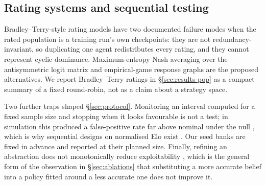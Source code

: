 \subsection{Rating systems and sequential testing}

Bradley--Terry-style rating models \cite{coulom-whr,herbrich-trueskill} have
two documented failure modes when the rated population is a training run's own
checkpoints: they are not redundancy-invariant, so duplicating one agent
redistributes every rating, and they cannot represent cyclic dominance.
Maximum-entropy Nash averaging over the antisymmetric logit matrix
\cite{balduzzi-reeval} and empirical-game response graphs
\cite{omidshafiei-alpharank} are the proposed alternatives. We report
Bradley--Terry ratings in \S\ref{sec:results-pop} as a compact summary of a
fixed round-robin, not as a claim about a strategy space.

Two further traps shaped \S\ref{sec:protocol}. Monitoring an interval computed
for a fixed sample size and stopping when it looks favourable is not a test;
in simulation this produced a false-positive rate far above nominal under the
null \cite{avaivat}, which is why sequential designs on normalised Elo exist
\cite{nelo}. Our seed banks are fixed in advance and reported at their planned
size. Finally, refining an abstraction does not monotonically reduce
exploitability \cite{waugh-abstraction}, which is the general form of the
observation in \S\ref{sec:ablations} that substituting a more accurate belief
into a policy fitted around a less accurate one does not improve it.
